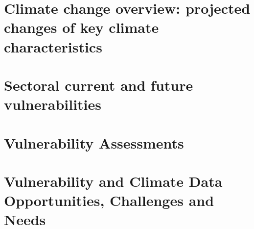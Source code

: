 \documentclass[
]{book}
\begin{document}
\hypertarget{climate-change-overview-projected-changes-of-key-climate-characteristics}{%
\section{Climate change overview: projected changes of key climate characteristics}\label{climate-change-overview-projected-changes-of-key-climate-characteristics}}

\hypertarget{sectoral-current-and-future-vulnerabilities}{%
\section{Sectoral current and future vulnerabilities}\label{sectoral-current-and-future-vulnerabilities}}

\hypertarget{vulnerability-assessments}{%
\section{Vulnerability Assessments}\label{vulnerability-assessments}}

\hypertarget{vulnerability-and-climate-data-opportunities-challenges-and-needs}{%
\section{Vulnerability and Climate Data Opportunities, Challenges and Needs}\label{vulnerability-and-climate-data-opportunities-challenges-and-needs}}

  
\end{document}

